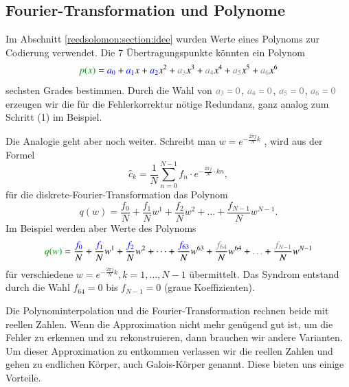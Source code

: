 \subsection{Fourier-Transformation und Polynome\label{reedsolomon:subsection:ftandpolynom}}
Im Abschnitt \ref{reedsolomon:section:idee}
wurden Werte eines Polynoms zur Codierung verwendet.
Die 7 Übertragungspunkte könnten ein Polynom
\begin{equation}
	\textcolor{darkgreen}{p(x)}
	=
	\textcolor{blue}{a_0} + \textcolor{blue}{a_1}x + \textcolor{blue}{a_2}x^2 +
	\textcolor{gray}{a_3}x^3 + \textcolor{gray}{a_4}x^4 + \textcolor{gray}{a_5}x^5 +
	\textcolor{gray}{a_6}x^6
\label{reedsolomon:equationpoly}
\end{equation}
sechsten Grades bestimmen.
Durch die Wahl von $\textcolor{gray}{a_3=0}$, $\textcolor{gray}{a_4=0}$, $\textcolor{gray}{a_5=0}$, $\textcolor{gray}{a_6=0}$ 
erzeugen wir die für die Fehlerkorrektur nötige Redundanz, ganz analog zum Schritt (1) im Beispiel.
\par 
Die Analogie geht aber noch weiter.
 Schreibt man 
 \( w =
 e^{-\frac{2\pi j}{N} k}\)
 \label{reedsolomon:DFT_summand}, wird aus der Formel
 \begin{equation}
	\hat{c}_{k} 
	= \frac{1}{N} \sum_{n=0}^{N-1}
	{f}_n \cdot e^{-\frac{2\pi j}{N} \cdot kn}
	,\label{reedsolomon:DFT}
 \end{equation}
 für die diskrete-Fourier-Transformation das Polynom
 \begin{equation}
	q(w)=
	\frac{{f}_0}{N} + \frac{{f}_1}{N} w^1 + \frac{{f}_2}{N} w^2 + \dots + \frac{{f}_{N-1}}{N} w^{N-1}.
	\label{reedsolomon:DFT_polynom}
 \end{equation}
 Im Beispiel werden aber Werte des Polynoms
 \begin{equation}
	\textcolor{darkgreen}{q(w)}=
	\frac{\textcolor{blue}{{f}_0}}{N} + \frac{\textcolor{blue}{{f}_1}}{N} w^1 + \frac{\textcolor{blue}{{f}_2}}{N} w^2 + \dots + 
	\frac{\textcolor{blue}{{f}_{63}}}{N} w^{63} + \frac{\textcolor{gray}{{f}_{64}}}{N} w^{64} + \textcolor{gray}{\dots} + \frac{\textcolor{gray}{{f}_{N-1}}}{N} w^{N-1}
	\label{reedsolomon:DFT_polynom2}
 \end{equation}
	für verschiedene \( w = e^{-\frac{2\pi j}{N} k}, k=1, \dots ,N-1\) übermittelt.
Das Syndrom entstand durch die Wahl ${f_{64}}=0$ bis ${f}_{N-1}=0$ (graue Koeffizienten).

Die Polynominterpolation und die Fourier-Transformation rechnen beide mit reellen Zahlen.
Wenn die Approximation nicht mehr genügend gut ist, um die Fehler zu erkennen und zu rekonstruieren,
dann brauchen wir andere Varianten.
Um dieser Approximation zu entkommen verlassen wir die reellen Zahlen und gehen zu endlichen Körper, auch Galois-Körper genannt.
%
%
%
Diese bieten uns einige Vorteile.
